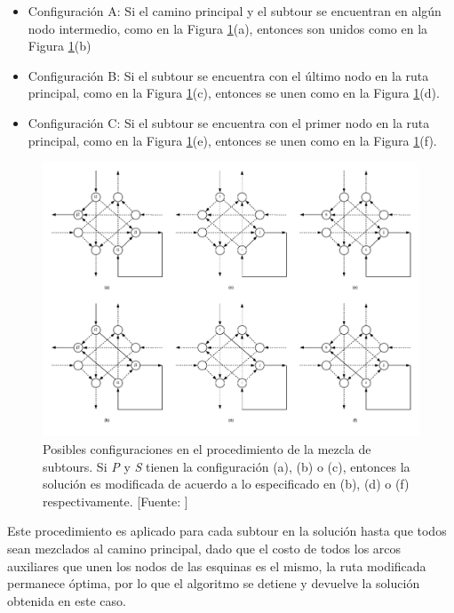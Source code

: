 \begin{itemize}
    \item Configuración A: Si el camino principal y el subtour se encuentran en algún nodo intermedio, como en la Figura \ref{fig:procedimiento_mezcla_subtours}(a), entonces son unidos como en la Figura \ref{fig:procedimiento_mezcla_subtours}(b)
    \item Configuración B: Si el subtour se encuentra con el último nodo en la ruta principal, como en la Figura \ref{fig:procedimiento_mezcla_subtours}(c), entonces se unen como en la Figura \ref{fig:procedimiento_mezcla_subtours}(d).
    \item Configuración C: Si el subtour se encuentra con el primer nodo en la ruta principal, como en la Figura \ref{fig:procedimiento_mezcla_subtours}(e), entonces se unen como en la Figura \ref{fig:procedimiento_mezcla_subtours}(f).
\end{itemize}

\begin{figure}[tbp]
\centerline{\includegraphics[width=\textwidth]{mezcla_subtours.png}}
\caption{Posibles configuraciones en el procedimiento de la mezcla de subtours. Si \textit{P} y \textit{S} tienen la configuración (a), (b) o (c), entonces la solución es modificada de acuerdo a lo especificado en (b), (d) o (f) respectivamente. [Fuente: \citet{Braier2017AnArgentina}]}
\label{fig:procedimiento_mezcla_subtours}
\end{figure}

Este procedimiento es aplicado para cada subtour en la solución hasta que todos sean mezclados al camino principal, dado que el costo de todos los arcos auxiliares que unen los nodos de las esquinas es el mismo, la ruta modificada permanece óptima, por lo que el algoritmo se detiene y devuelve la solución obtenida en este caso.

